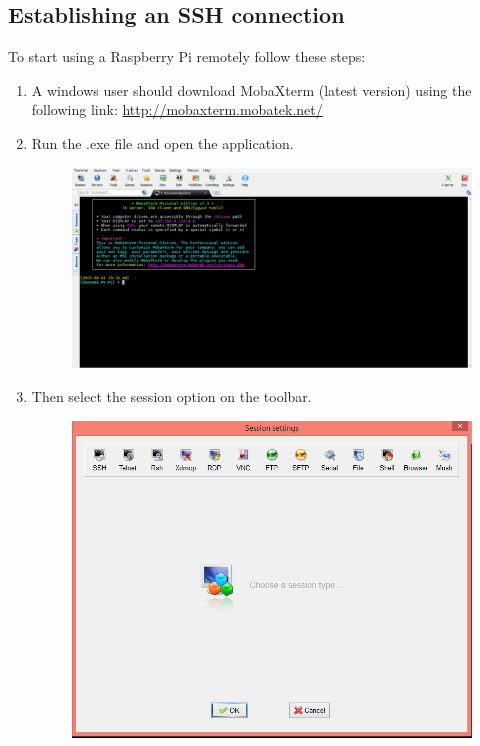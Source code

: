 \documentclass[11pt,a4paper]{article}
\begin{document}
	
	\newpage	
	\subsection{Establishing an SSH connection}
	
	To start using a Raspberry Pi remotely follow these steps:
	\begin{enumerate}
		\item A windows user should download MobaXterm (latest version) using the following link: \url{http://mobaxterm.mobatek.net/}
		\item Run the .exe file and open the application.
		\begin{figure}[h!]
			\includegraphics[scale=0.3]{M1.PNG}
			\centering
		\end{figure}
		\item Then select the session option on the toolbar.
		\begin{figure}[h!]
			\includegraphics[scale=0.5]{M2.PNG}

\end{figure}
\end{enumerate}
\end{document}
